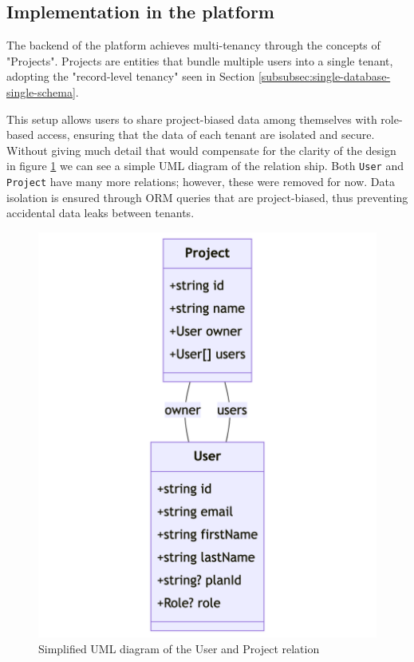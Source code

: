\subsection{Implementation in the platform}
The backend of the platform achieves multi-tenancy through the concepts of "Projects".
Projects are entities that bundle multiple users into a single tenant, adopting the "record-level tenancy" seen in Section \ref{subsubsec:single-database-single-schema}.

This setup allows users to share project-biased data among themselves with role-based access, ensuring that the data of each tenant are isolated and secure.
Without giving much detail that would compensate for the clarity of the design in figure \ref{img04:uml-user-project} we can see a simple UML diagram of the relation ship. 
Both \texttt{User} and \texttt{Project} have many more relations; however, these were removed for now.
Data isolation is ensured through ORM queries that are project-biased, thus preventing accidental data leaks between tenants.





\begin{figure}[p]\centering
\includegraphics[width=140mm]{img/chap04/fig_simplified_project_concept.png}
\caption{Simplified UML diagram of the User and Project relation}
\label{img04:uml-user-project}
\end{figure}
